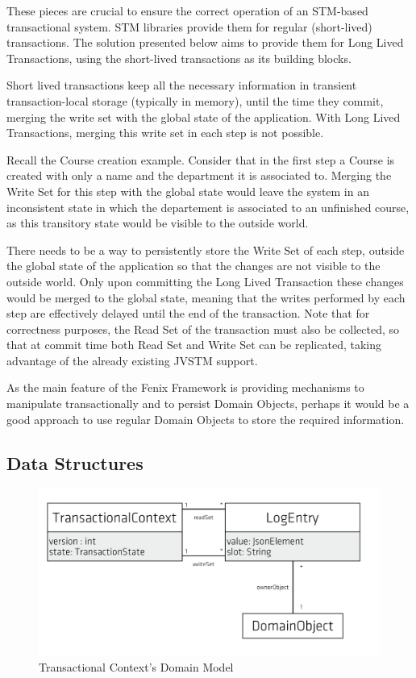 These pieces are crucial to ensure the correct operation of an
STM-based transactional system. STM libraries provide them for regular
(short-lived) transactions. The solution presented below aims to
provide them for Long Lived Transactions, using the short-lived
transactions as its building blocks.

Short lived transactions keep all the necessary information in
transient transaction-local storage (typically in memory), until the
time they commit, merging the write set with the global state of the
application. With Long Lived Transactions, merging this write set in
each step is not possible.

Recall the Course creation example. Consider that in the first step a
Course is created with only a name and the department it is associated
to. Merging the Write Set for this step with the global state would
leave the system in an inconsistent state in which the departement is
associated to an unfinished course, as this transitory state would be
visible to the outside world.

There needs to be a way to persistently store the Write Set of each
step, outside the global state of the application so that the changes
are not visible to the outside world. Only upon committing the Long
Lived Transaction these changes would be merged to the global state,
meaning that the writes performed by each step are effectively delayed
until the end of the transaction. Note that for correctness purposes,
the Read Set of the transaction must also be collected, so that at
commit time both Read Set and Write Set can be replicated, taking
advantage of the already existing JVSTM support.

As the main feature of the Fenix Framework is providing mechanisms to
manipulate transactionally and to persist Domain Objects, perhaps it
would be a good approach to use regular Domain Objects to store the
required information.

\subsection{Data Structures}

\begin{figure}
\centering
\includegraphics[width=0.8\linewidth]{tx-context}
\caption{Transactional Context's Domain Model}
\label{fig:transactionalContext}
\end{figure}

